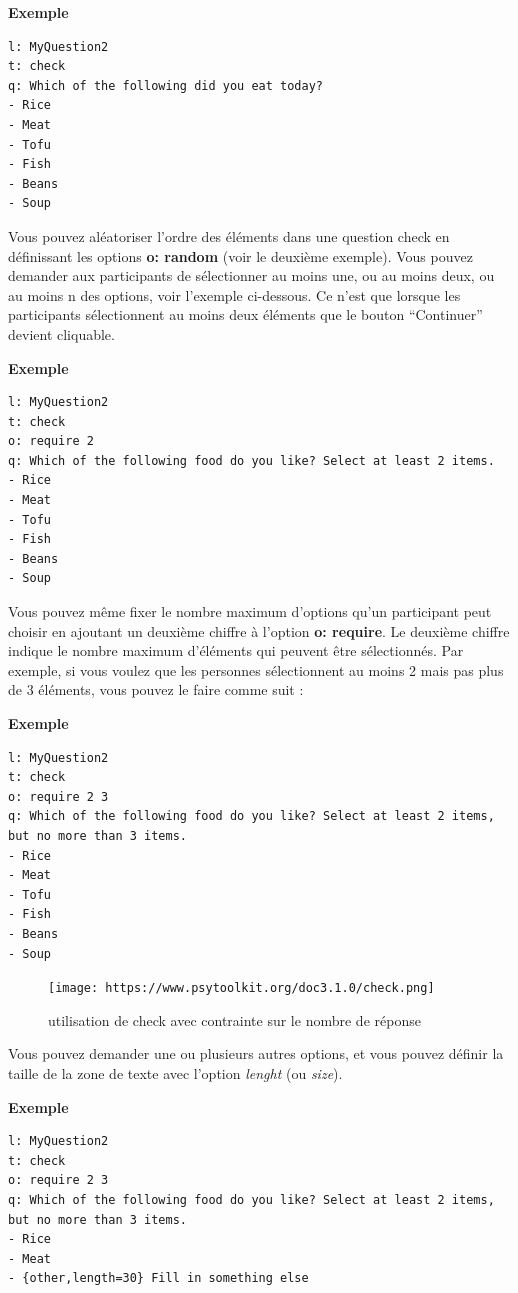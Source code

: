 \documentclass[
]{book}
\begin{document}
\textbf{Exemple}

\begin{verbatim}
l: MyQuestion2
t: check
q: Which of the following did you eat today?
- Rice
- Meat
- Tofu
- Fish
- Beans
- Soup
\end{verbatim}

Vous pouvez aléatoriser l'ordre des éléments dans une question check en définissant les options \textbf{o: random} (voir le deuxième exemple). Vous pouvez demander aux participants de sélectionner au moins une, ou au moins deux, ou au moins n des options, voir l'exemple ci-dessous. Ce n'est que lorsque les participants sélectionnent au moins deux éléments que le bouton ``Continuer'' devient cliquable.

\textbf{Exemple}

\begin{verbatim}
l: MyQuestion2
t: check
o: require 2
q: Which of the following food do you like? Select at least 2 items.
- Rice
- Meat
- Tofu
- Fish
- Beans
- Soup
\end{verbatim}

Vous pouvez même fixer le nombre maximum d'options qu'un participant peut choisir en ajoutant un deuxième chiffre à l'option \textbf{o: require}. Le deuxième chiffre indique le nombre maximum d'éléments qui peuvent être sélectionnés. Par exemple, si vous voulez que les personnes sélectionnent au moins 2 mais pas plus de 3 éléments, vous pouvez le faire comme suit :

\textbf{Exemple}

\begin{verbatim}
l: MyQuestion2
t: check
o: require 2 3
q: Which of the following food do you like? Select at least 2 items, but no more than 3 items.
- Rice
- Meat
- Tofu
- Fish
- Beans
- Soup
\end{verbatim}

\begin{figure}
\centering
\texttt{[image: https://www.psytoolkit.org/doc3.1.0/check.png]}
\caption{utilisation de check avec contrainte sur le nombre de réponse}
\end{figure}

Vous pouvez demander une ou plusieurs autres options, et vous pouvez définir la taille de la zone de texte avec l'option \emph{lenght} (ou \emph{size}).

\textbf{Exemple}

\begin{verbatim}
l: MyQuestion2
t: check
o: require 2 3
q: Which of the following food do you like? Select at least 2 items, but no more than 3 items.
- Rice
- Meat
- {other,length=30} Fill in something else
\end{verbatim}
\end{document}
